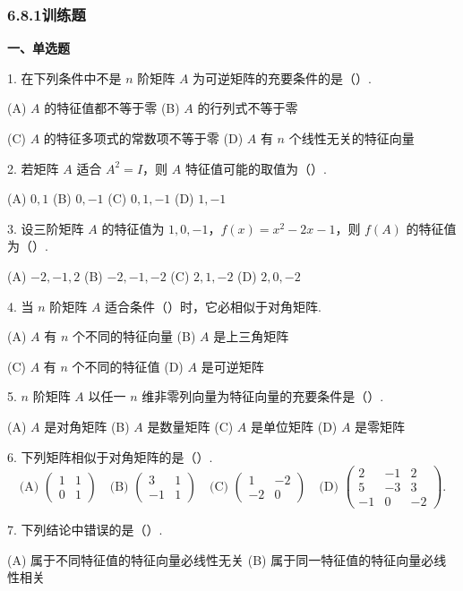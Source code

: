 \documentclass[UTF8, 12pt, fontset=fandol, oneside]{ctexart}
\begin{document}
\subsubsection*{6.8.1\quad 训练题}

\noindent\textbf{一、单选题}

1. 在下列条件中不是 $n$ 阶矩阵 $A$ 为可逆矩阵的充要条件的是（\quad ）.

(A) $A$ 的特征值都不等于零 \qquad (B) $A$ 的行列式不等于零

(C) $A$ 的特征多项式的常数项不等于零 \qquad (D) $A$ 有 $n$ 个线性无关的特征向量

2. 若矩阵 $A$ 适合 $A^2=I$，则 $A$ 特征值可能的取值为（\quad ）.

(A) $0,1$ \qquad (B) $0,-1$ \qquad (C) $0,1,-1$ \qquad (D) $1,-1$

3. 设三阶矩阵 $A$ 的特征值为 $1,0,-1$，$f(x)=x^2-2x-1$，则 $f(A)$ 的特征值为（\quad ）.

(A) $-2,-1,2$ \qquad (B) $-2,-1,-2$ \qquad (C) $2,1,-2$ \qquad (D) $2,0,-2$

4. 当 $n$ 阶矩阵 $A$ 适合条件（\quad ）时，它必相似于对角矩阵.

(A) $A$ 有 $n$ 个不同的特征向量 \qquad (B) $A$ 是上三角矩阵

(C) $A$ 有 $n$ 个不同的特征值 \qquad (D) $A$ 是可逆矩阵

5. $n$ 阶矩阵 $A$ 以任一 $n$ 维非零列向量为特征向量的充要条件是（\quad ）.

(A) $A$ 是对角矩阵 \qquad (B) $A$ 是数量矩阵 \qquad (C) $A$ 是单位矩阵 \qquad (D) $A$ 是零矩阵

6. 下列矩阵相似于对角矩阵的是（\quad ）.
\[
\text{(A) }\begin{pmatrix}1&1\\0&1\end{pmatrix}\quad
\text{(B) }\begin{pmatrix}3&1\\-1&1\end{pmatrix}\quad
\text{(C) }\begin{pmatrix}1&-2\\-2&0\end{pmatrix}\quad
\text{(D) }\begin{pmatrix}2&-1&2\\5&-3&3\\-1&0&-2\end{pmatrix}.
\]

7. 下列结论中错误的是（\quad ）.

(A) 属于不同特征值的特征向量必线性无关 \qquad (B) 属于同一特征值的特征向量必线性相关
\end{document}
